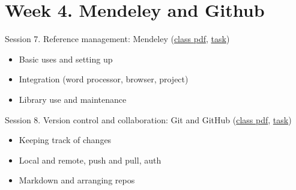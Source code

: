 \documentclass[a4paper,12pt]{article} %
\begin{document}
\section{{\color{red}Week 4. Mendeley and Github}}
	Session 7. Reference management: Mendeley (\href{https://canvas.wlv.ac.uk/courses/33429/files/folder/LaTeX\%20and\%20Mendeley\%20workshop/w4_mendeley_github?preview=4671040}{class pdf}, \href{https://canvas.wlv.ac.uk/courses/33429/files/folder/LaTeX\%20and\%20Mendeley\%20workshop/w4_mendeley_github?preview=4671042}{task})
	\begin{itemize}
		\item Basic uses and setting up
		\item Integration (word processor, browser, project)
		\item Library use and maintenance 
	\end{itemize}%
	Session 8. Version control and collaboration: Git and GitHub (\href{https://canvas.wlv.ac.uk/courses/33429/files/folder/LaTeX\%20and\%20Mendeley\%20workshop/w4_mendeley_github?preview=4671041}{class pdf}, \href{https://canvas.wlv.ac.uk/courses/33429/files/folder/LaTeX\%20and\%20Mendeley\%20workshop/w4_mendeley_github?preview=4671043}{task})
	\begin{itemize}
		\item Keeping track of changes
		\item Local and remote, push and pull, auth
		\item Markdown and arranging repos
	\end{itemize}
\end{document}
